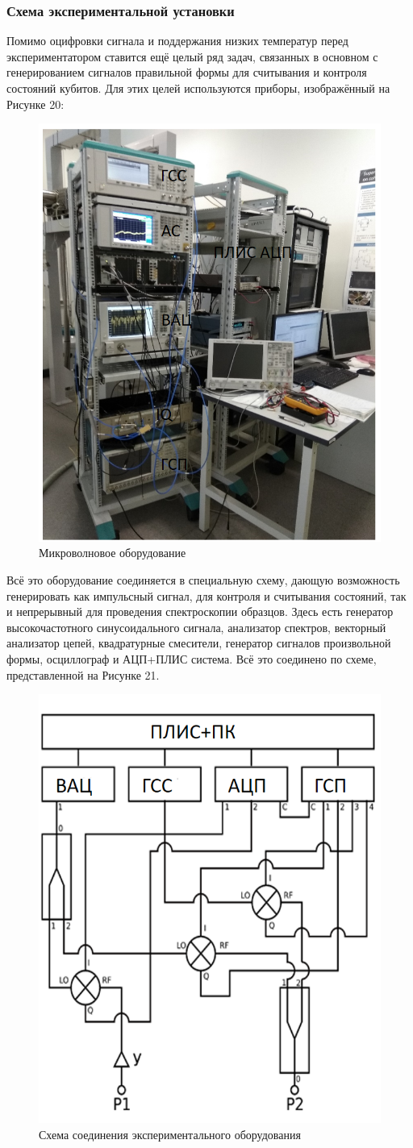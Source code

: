 \subsubsection{Схема экспериментальной установки}  
Помимо оцифровки сигнала и поддержания низких температур перед экспериментатором ставится ещё целый ряд задач, связанных в основном с генерированием сигналов правильной формы для считывания и контроля состояний кубитов. Для этих целей используются приборы, изображённый на Рисунке 20:

\begin{figure}[h]
	\centering
	\includegraphics[width=0.6\linewidth]{pictures/shema1}
	\caption{Микроволновое оборудование}
	\label{fig:shema1}
\end{figure}


Всё это оборудование соединяется в специальную схему, дающую возможность генерировать как импульсный сигнал, для контроля и считывания состояний, так и непрерывный для проведения спектроскопии образцов. Здесь есть генератор высокочастотного синусоидального сигнала, анализатор спектров, векторный анализатор цепей, квадратурные смесители, генератор сигналов произвольной формы, осциллограф и АЦП+ПЛИС система. Всё это соединено по схеме, представленной на Рисунке 21. 

\begin{figure}[t!]
	\centering
	\includegraphics[width=0.5\linewidth]{pictures/shema}
	\caption{Схема соединения экспериментального оборудования}
	\label{fig:shema}
\end{figure}

